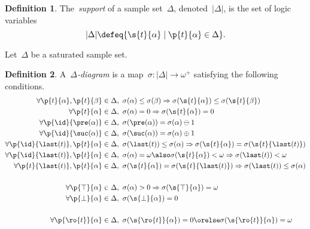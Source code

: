 \documentclass{scrartcl}
\theoremstyle{definition}
\newtheorem{definition}{Definition}[section]
\begin{document}
\begin{definition}
  The~\emph{support} of a sample set~$\Delta$, denoted~$|\Delta|$, is the set of
  logic variables
  \[
    |\Delta|
    \defeq
    \{ \s{t}{\alpha} \mid \p{t}{\alpha} \in \Delta \}.
  \]
\end{definition}

\setcounter{equation}{-1}

Let~$\Delta$ be a saturated sample set.

\begin{definition}
  A~\emph{$\Delta$-diagram} is a map~$\sigma : |\Delta| \to \omega^+$ satisfying
  the following conditions.
  \begin{align}
    \forall \p{t}{\alpha},\p{t}{\beta} \in \Delta
    &, ~
    \sigma(\alpha) \le \sigma(\beta) \Rightarrow \sigma(\s{t}{\alpha}) \le
    \sigma(\s{t}{\beta})
    \\
    \forall \p{t}{\alpha} \in \Delta
    &, ~
    \sigma(\alpha) = 0 \Rightarrow \sigma(\s{t}{\alpha}) = 0
    \\
    \forall \p{\id}{\pre(\alpha)} \in \Delta
    &, ~
    \sigma(\pre(\alpha)) = \sigma(\alpha) \ominus 1
    \\
    \forall \p{\id}{\suc(\alpha)} \in \Delta
    &, ~
    \sigma(\suc(\alpha)) = \sigma(\alpha) \oplus 1
    \\
    \forall \p{\id}{\last(t)}, \p{t}{\alpha} \in \Delta
    &, ~
    \sigma(\last(t)) \le \sigma(\alpha)
    \Rightarrow
    \sigma(\s{t}{\alpha}) = \sigma(\s{t}{\last(t)})
    \\
    \forall \p{\id}{\last(t)}, \p{t}{\alpha} \in \Delta
    &, ~
    \sigma(\alpha) =\omega\also \sigma(\s{t}{\alpha}) < \omega
    \Rightarrow
    \sigma(\last(t))<\omega
    \\
    \forall \p{t}{\last(t)}, \p{t}{\alpha} \in \Delta
    &, ~
    \sigma(\s{t}{\alpha}) = \sigma(\s{t}{\last(t)})
    \Rightarrow
    \sigma(\last(t)) \le \sigma(\alpha)
    \\
    \\
    \forall \p{\top}{\alpha} \in \Delta
    &, ~
    \sigma(\alpha) > 0 \Rightarrow \sigma(\s{\top}{\alpha}) = \omega
    \\
    \forall \p{\bot}{\alpha} \in \Delta
    &, ~
    \sigma(\s{\bot}{\alpha}) = 0
    \\
    \\
    \forall \p{\ro{t}}{\alpha} \in \Delta
    &, ~
    \sigma(\s{\ro{t}}{\alpha}) = 0 \orelse \sigma(\s{\ro{t}}{\alpha}) = \omega
    \\

\end{align}
\end{definition}
\end{document}
